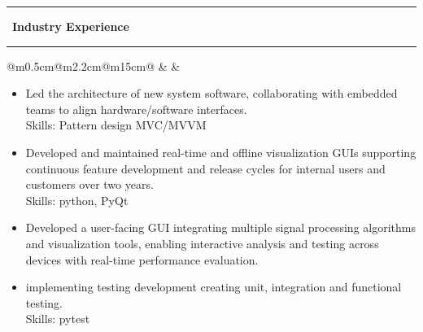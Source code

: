 \documentclass[10pt,a4paper]{article}
\newcommand{\sectionline}[1]{%
  \vspace{0.5em}
  \begin{center}
    \textcolor{title_color}{\rule[0.5ex]{0.25\linewidth}{0.5pt}}
    ~{\LARGE \bfseries \textcolor{title_color}{\cambria #1}}~
    \textcolor{title_color}{\rule[0.5ex]{0.25\linewidth}{0.5pt}}
  \end{center}
  \vspace{0.05em}
}
\begin{document}
                      
\newpage
\sectionline{Industry Experience}                    
\begin{tabular}{@{}m{0.5cm}@{\hspace{0.5em}}m{2.2cm}@{\hspace{0.5em}}m{15cm}@{}}
   & 
  \raisebox{0.3em}{\begin{minipage}[t]{\linewidth}
  \centering
    \textcolor{blocktitle1_color}{Sep. 21}\\
    \textcolor{blocktitle1_color}{Present}
  \end{minipage} 
  } &
\end{tabular}                                  

\vspace{0.4em}
\begin{itemize}[leftmargin=*]
  \item Led the architecture of new system software, collaborating with embedded teams to align hardware/software interfaces. 
  \\ {\fontsize{10pt}{10pt}\selectfont\textcolor{blocktext2_color}{Skills: Pattern design MVC/MVVM }}    

  \item  Developed and maintained real-time and offline visualization GUIs supporting continuous feature development and release cycles for internal users and customers over two years. 
  \\ {\fontsize{10pt}{10pt}\selectfont\textcolor{blocktext2_color}{Skills: python, PyQt}}     
  
  \item Developed a user-facing GUI integrating multiple signal processing algorithms and visualization tools, enabling interactive analysis and testing across devices with real-time performance evaluation.
  
  \item implementing testing development creating unit, integration and functional testing. 
  \\ {\fontsize{10pt}{10pt}\selectfont\textcolor{blocktext2_color}{Skills: pytest}}  
\end{itemize}                
                
\end{document}
